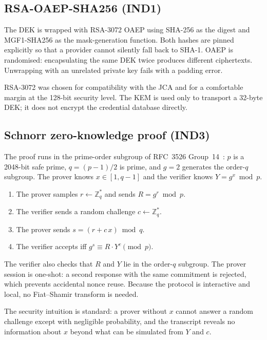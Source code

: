 \documentclass[11pt,a4paper]{article}
\begin{document}
\subsection{RSA-OAEP-SHA256 (IND1)}

The DEK is wrapped with RSA-3072 OAEP using SHA-256 as the digest and MGF1-SHA256
as the mask-generation function. Both hashes are pinned explicitly so that a
provider cannot silently fall back to SHA-1. OAEP is randomised: encapsulating
the same DEK twice produces different ciphertexts. Unwrapping with an unrelated
private key fails with a padding error.

RSA-3072 was chosen for compatibility with the JCA and for a comfortable margin
at the 128-bit security level. The KEM is used only to transport a 32-byte DEK;
it does not encrypt the credential database directly.

\subsection{Schnorr zero-knowledge proof (IND3)}

The proof runs in the prime-order subgroup of RFC~3526 Group~14~\cite{rfc3526}:
$p$ is a 2048-bit safe prime, $q = (p-1)/2$ is prime, and $g = 2$ generates the
order-$q$ subgroup. The prover knows $x \in [1, q-1]$ and the verifier knows
$Y = g^{x} \bmod p$.

\begin{enumerate}[leftmargin=*]
  \item The prover samples $r \gets \mathbb{Z}_q^{*}$ and sends
        $R = g^{r} \bmod p$.
  \item The verifier sends a random challenge $c \gets \mathbb{Z}_q^{*}$.
  \item The prover sends $s = (r + c\,x) \bmod q$.
  \item The verifier accepts iff $g^{s} \equiv R \cdot Y^{c} \pmod{p}$.
\end{enumerate}

The verifier also checks that $R$ and $Y$ lie in the order-$q$ subgroup. The
prover session is one-shot: a second response with the same commitment is
rejected, which prevents accidental nonce reuse. Because the protocol is
interactive and local, no Fiat--Shamir transform is needed.

The security intuition is standard: a prover without $x$ cannot answer a random
challenge except with negligible probability, and the transcript reveals no
information about $x$ beyond what can be simulated from $Y$ and $c$.
\end{document}
